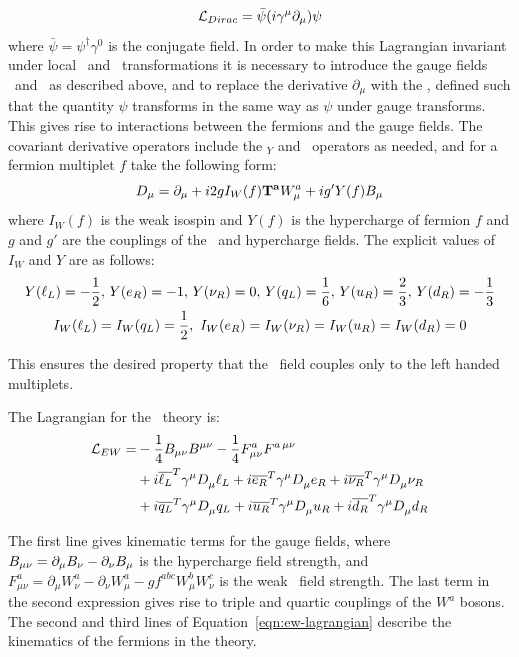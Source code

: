 \begin{equation}
\Lagr_{Dirac} = \bar{\psi} ( i \gamma^\mu \partial_{\mu} ) \psi
\end{equation}
where $\bar{\psi} = \psi^{\dagger}\gamma^{0}$ is the conjugate field. In order to
make this Lagrangian invariant under local \uone\ and \sutwo\ transformations it is
necessary to introduce the gauge fields \Bmu\ and \Wmu\ as described above, and
to replace the derivative $\partial_{\mu}$ with the 
\Dmu,
defined such that the quantity \Dmu$\psi$ transforms in the same way as $\psi$
under gauge transforms. This gives rise to interactions between the
fermions and the gauge fields. The covariant derivative operators include the
\uone$_{Y}$ and \sutwo\ operators as needed, and for a fermion multiplet $f$
take the following form:
\begin{equation}
D_{\mu}  =  \partial_{\mu} + i2gI_{W}(f)\mathbf{T^{a}} W_{\mu}^{a} + ig'Y(f)B_{\mu}
\label{eqn:ew-covariant-derivative}
\end{equation}
where $I_{W}(f)$ is the weak isospin and $Y(f)$ is the
hypercharge of fermion $f$ and $g$ and $g'$ are the couplings of the \sutwo\ and
hypercharge fields. The explicit values of $I_{W}$ and $Y$ are as
follows:
\begin{gather}
Y(\ell_{L}) = - \frac{1}{2},\, Y(e_{R}) = - 1,\, Y(\nu_{R}) =0,\, Y(q_{L}) = \frac{1}{6},\,
Y(u_{R}) = \frac{2}{3},\, Y(d_{R}) = - \frac{1}{3} \notag\\
I_{W}(\ell_{L}) = I_{W}(q_{L}) = \frac{1}{2}, \  I_{W}(e_{R}) = I_{W}(\nu_{R}) =  I_{W}(u_{R}) = I_{W}(d_{R}) = 0 
\label{eqn:hypercharges}
\end{gather}

This ensures the desired property that the \sutwo\ field
couples only to the left handed multiplets. 

The Lagrangian for the \ew\ theory is:
\begin{align}
\mathcal{L}_{EW}  = & - \frac{1}{4} B_{\mu\nu} B^{\mu\nu} - \frac{1}{4} F^{a}_{\mu\nu}
F^{a\,\mu\nu} \notag \\
& +  i \overline{\ell_{L}}^{T} \gamma^{\mu} D_{\mu}^{} \ell_{L} + i  \overline{e_{R}}^{T} \gamma^{\mu}
D_{\mu}^{} e_{R} + i \overline{\nu_{R}}^{T} \gamma^{\mu} D_{\mu}^{} \nu_{R} \notag \\
& +  i \overline{q_{L}}^{T} \gamma^{\mu} D_{\mu}^{} q_{L} + i  \overline{u_R}^{T} \gamma^{\mu}
D_{\mu}^{} u_R + i \overline{d_R}^{T} \gamma^{\mu} D_{\mu}^{} d_{R} 
\label{eqn:ew-lagrangian}
\end{align}

The first line gives kinematic terms for the gauge fields, where $ B_{\mu\nu} =
\partial_{\mu} B_{\nu} - \partial_{\nu} B_{\mu}$ is the hypercharge field strength,
and  $ F^{a}_{\mu\nu} =
\partial_{\mu} W^{a}_{\nu} - \partial_{\nu} W^{a}_{\mu} - g f^{abc} W^{b}_{\mu}
W^{c}_{\nu}$ is the weak \sutwo\ field strength. The last term in the second
expression gives rise to triple and quartic couplings of the $W^{a}$ bosons. 
The second and third lines of Equation~\ref{eqn:ew-lagrangian} describe the
kinematics of the fermions in the theory. 

